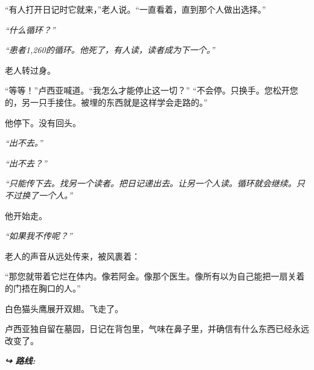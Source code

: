 \noindent \textquotedblleft{有人打开日记时它就来，\textquotedblright{}}老人说。\textquotedblleft{一直看着，直到那个人做出选择。\textquotedblright{}}

\noindent \textit{\textquotedblleft{}什么循环？\textquotedblright{}}

\noindent \textit{\textquotedblleft{}患者1,260的循环。他死了，有人读，读者成为下一个。\textquotedblright{}}

\noindent 老人转过身。

\noindent \textquotedblleft{等等！\textquotedblright{}}卢西亚喊道。\textquotedblleft{我怎么才能停止这一切？\textquotedblright{}}
\noindent \textquotedblleft{不会停。只换手。您松开您的，另一只手接住。被埋的东西就是这样学会走路的。\textquotedblright{}}

\noindent 他停下。没有回头。

\noindent \textit{\textquotedblleft{}出不去。\textquotedblright{}}

\noindent \textit{\textquotedblleft{}出不去？\textquotedblright{}}

\noindent \textit{\textquotedblleft{}只能传下去。找另一个读者。把日记递出去。让另一个人读。循环就会继续。只不过换了一个人。\textquotedblright{}}

\noindent 他开始走。

\noindent \textit{\textquotedblleft{}如果我不传呢？\textquotedblright{}}

\noindent 老人的声音从远处传来，被风裹着：

\noindent \textquotedblleft{那您就带着它烂在体内。像若阿金。像那个医生。像所有以为自己能把一扇关着的门捂在胸口的人。\textquotedblright{}}

\noindent 白色猫头鹰展开双翅。飞走了。

\noindent 卢西亚独自留在墓园，日记在背包里，气味在鼻子里，并确信有什么东西已经永远改变了。

\vspace{0.5em}
\noindent\textit{\textbf{↪ 路线:}  \rotasep {}}

